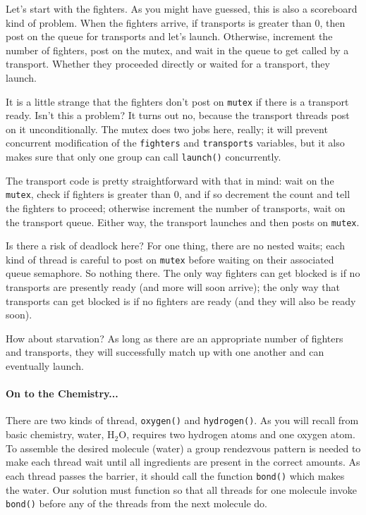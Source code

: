 Let's start with the fighters. As you might have guessed, this is also a scoreboard kind of problem. When the fighters arrive, if transports is greater than 0, then post on the queue for transports and let's launch. Otherwise, increment the number of fighters, post on the mutex, and wait in the queue to get called by a transport. Whether they proceeded directly or waited for a transport, they launch.

It is a little strange that the fighters don't post on \texttt{mutex} if there is a transport ready. Isn't this a problem? It turns out no, because the transport threads post on it unconditionally. The mutex does two jobs here, really; it will prevent concurrent modification of the \texttt{fighters} and \texttt{transports} variables, but it also makes sure that only one group can call \texttt{launch()} concurrently.

The transport code is pretty straightforward with that in mind: wait on the \texttt{mutex}, check if fighters is greater than 0, and if so decrement the count and tell the fighters to proceed; otherwise increment the number of transports, wait on the transport queue. Either way, the transport launches and then posts on \texttt{mutex}. 

Is there a risk of deadlock here? For one thing, there are no nested waits; each kind of thread is careful to post on \texttt{mutex} before waiting on their associated queue semaphore. So nothing there. The only way fighters can get blocked is if no transports are presently ready (and more will soon arrive); the only way that transports can get blocked is if no fighters are ready (and they will also be ready soon). 

How about starvation? As long as there are an appropriate number of fighters and transports, they will successfully match up with one another and can eventually launch. 

\paragraph{On to the Chemistry...}
There are two kinds of thread, \texttt{oxygen()} and \texttt{hydrogen()}. As you will recall from basic chemistry, water, H$_{2}$O, requires two hydrogen atoms and one oxygen atom. To assemble the desired molecule (water) a group rendezvous pattern is needed to make each thread wait until all ingredients are present in the correct amounts. As each thread passes the barrier, it should call the function \texttt{bond()} which makes the water. Our solution must function so that all threads for one molecule invoke \texttt{bond()} before any of the threads from the next molecule do.

